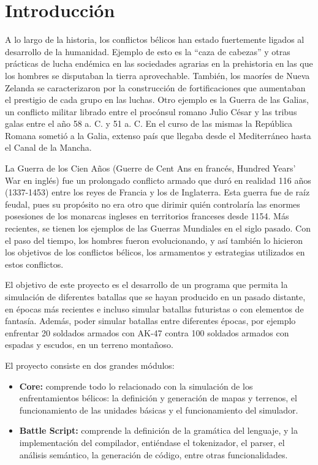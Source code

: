 \section{Introducción}

A lo largo de la historia, los conflictos bélicos han estado fuertemente ligados al desarrollo de la humanidad. Ejemplo de esto es la ``caza de cabezas'' y otras prácticas de lucha endémica en las sociedades agrarias en la prehistoria en las que los hombres se disputaban la tierra aprovechable. También, los maoríes de Nueva Zelanda se caracterizaron por la construcción de fortificaciones que aumentaban el prestigio de cada grupo en las luchas. Otro ejemplo es la Guerra de las Galias, un conflicto militar librado entre el procónsul romano Julio César y las tribus galas entre el año 58 a. C. y 51 a. C. En el curso de las mismas la República Romana sometió a la Galia, extenso país que llegaba desde el Mediterráneo hasta el Canal de la Mancha. 

La Guerra de los Cien Años (Guerre de Cent Ans en francés, Hundred Years' War en inglés) fue un prolongado conflicto armado que duró en realidad 116 años (1337-1453) entre los reyes de Francia y los de Inglaterra. Esta guerra fue de raíz feudal, pues su propósito no era otro que dirimir quién controlaría las enormes posesiones de los monarcas ingleses en territorios franceses desde 1154. Más recientes, se tienen los ejemplos de las Guerras Mundiales en el siglo pasado. Con el paso del tiempo, los hombres fueron evolucionando, y así también lo hicieron los objetivos de los conflictos bélicos, los armamentos y estrategias utilizados en estos conflictos.

El objetivo de este proyecto es el desarrollo de un programa que permita la simulación de diferentes batallas que se hayan producido en un pasado distante, en épocas más recientes e incluso simular batallas futuristas o con elementos de fantasía. Además, poder simular batallas entre diferentes épocas, por ejemplo enfrentar 20 soldados armados con AK-47 contra 100 soldados armados con espadas y escudos, en un terreno montañoso.

El proyecto consiste en dos grandes módulos:

\begin{itemize}
    \item \textbf{Core:} comprende todo lo relacionado con la simulación de los enfrentamientos bélicos: la definición y generación de mapas y terrenos, el funcionamiento de las unidades básicas y el funcionamiento del simulador.
    \item \textbf{Battle Script:} comprende la definición de la gramática del lenguaje, y la implementación del compilador, entiéndase el tokenizador, el parser, el an\'alisis sem\'antico, la generación de código, entre otras funcionalidades.
\end{itemize}

